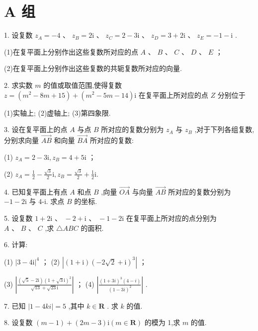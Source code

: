 \documentclass[10pt]{article}
\begin{document}
\section*{A 组}

1. 设复数 \({z}_{A} =  - 4\text{ 、 }{z}_{B} = 2\mathrm{i}\text{ 、 }{z}_{C} = 2 - 3\mathrm{i}\text{ 、 }{z}_{D} = 3 + 2\mathrm{i}\text{ 、 }{z}_{E} =  - 1 - \mathrm{i}\) .

(1)在复平面上分别作出这些复数所对应的点 \(A\) 、 \(B\) 、 \(C\) 、 \(D\) 、 \(E\) ；

(2)在复平面上分别作出这些复数的共轭复数所对应的向量.

2. 求实数 \(m\) 的值或取值范围,使得复数 \(z = \left( {{m}^{2} - {8m} + {15}}\right)  + \left( {{m}^{2} - {5m} - {14}}\right) \mathrm{i}\) 在复平面上所对应的点 \(Z\) 分别位于

(1)实轴上; (2)虚轴上; (3)第四象限.

3. 设在复平面上的点 \(A\) 与点 \(B\) 所对应的复数分别为 \({z}_{A}\) 与 \({z}_{B}\) ,对于下列各组复数,分别求向量 \(\overrightarrow{AB}\) 和向量 \(\overrightarrow{BA}\) 所对应的复数:

(1) \({z}_{A} = 2 - {3\mathrm{i}},{z}_{B} = 4 + {5\mathrm{i}}\) ；

(2) \({z}_{A} = \frac{1}{2} - \frac{\sqrt{3}}{2}\mathrm{i},{z}_{B} = \frac{\sqrt{3}}{2} + \frac{1}{2}\mathrm{i}.\)

4. 已知复平面上有点 \(A\) 和点 \(B\) ,向量 \(\overrightarrow{OA}\) 与向量 \(\overrightarrow{AB}\) 所对应的复数分别为 \(- 1 - {2\mathrm{i}}\) 与 4-i. 求点 \(B\) 的坐标.

5. 设复数 \(1 + 2\mathrm{i}\text{ 、 } - 2 + \mathrm{i}\text{ 、 } - 1 - 2\mathrm{i}\) 在复平面上所对应的点分别为 \(A\text{ 、 }B\text{ 、 }C\) ,求 \(\bigtriangleup {ABC}\) 的面积.

6. 计算:

(1) \({\left| 3 - 4\mathrm{i}\right| }^{4}\) ； (2) \(\left| {\left( {1 + \mathrm{i}}\right) {\left( -2\sqrt{2} + \mathrm{i}\right) }^{3}}\right|\) ；

(3) \(\left| \frac{\left( {\sqrt{5} - 2\mathrm{i}}\right) {\left( 1 + \sqrt{3}\mathrm{i}\right) }^{2}}{\sqrt{13} + \sqrt{23}\mathrm{i}}\right|\) ； (4) \(\left| \frac{{\left( 1 + 3i\right) }^{3}\left( {4 - i}\right) }{{\left( 1 - 3i\right) }^{2}}\right|\) .

7. 已知 \(\left| {1 - {4ki}}\right|  = 5\) ,其中 \(k \in  \mathbf{R}\) . 求 \(k\) 的值.

8. 设复数 \(\left( {m - 1}\right)  + \left( {{2m} - 3}\right) \mathrm{i}\left( {m \in  \mathbf{R}}\right)\) 的模为 1,求 \(m\) 的值.
\end{document}

